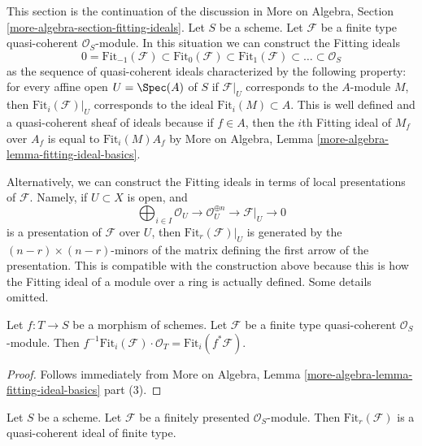 \noindent
This section is the continuation of the discussion in
More on Algebra, Section \ref{more-algebra-section-fitting-ideals}.
Let $S$ be a scheme. Let $\mathcal{F}$ be a
finite type quasi-coherent $\mathcal{O}_S$-module.
In this situation we can construct the Fitting ideals
$$
0 = \text{Fit}_{-1}(\mathcal{F}) \subset \text{Fit}_0(\mathcal{F}) \subset
\text{Fit}_1(\mathcal{F}) \subset \ldots \subset \mathcal{O}_S
$$
as the sequence of quasi-coherent ideals characterized by the following
property: for every affine open $U = \Spec(A)$ of $S$ if $\mathcal{F}|_U$
corresponds to the $A$-module $M$, then $\text{Fit}_i(\mathcal{F})|_U$
corresponds to the ideal $\text{Fit}_i(M) \subset A$.
This is well defined and a quasi-coherent sheaf of ideals because
if $f \in A$, then the $i$th Fitting ideal of $M_f$ over $A_f$
is equal to $\text{Fit}_i(M) A_f$ by
More on Algebra, Lemma \ref{more-algebra-lemma-fitting-ideal-basics}.

\medskip\noindent
Alternatively, we can construct the Fitting ideals in terms of local
presentations of $\mathcal{F}$. Namely, if $U \subset X$ is open, and
$$
\bigoplus\nolimits_{i \in I} \mathcal{O}_U \to
\mathcal{O}_U^{\oplus n} \to \mathcal{F}|_U \to 0
$$
is a presentation of $\mathcal{F}$ over $U$, then
$\text{Fit}_r(\mathcal{F})|_U$ is generated by the
$(n - r) \times (n - r)$-minors
of the matrix defining the first arrow of the presentation.
This is compatible with the construction above because this
is how the Fitting ideal of a module over a ring is actually defined.
Some details omitted.

\begin{lemma}
\label{lemma-base-change-fitting-ideal}
Let $f : T \to S$ be a morphism of schemes.
Let $\mathcal{F}$ be a finite type quasi-coherent $\mathcal{O}_S$-module.
Then
$f^{-1}\text{Fit}_i(\mathcal{F}) \cdot \mathcal{O}_T =
\text{Fit}_i(f^*\mathcal{F})$.
\end{lemma}

\begin{proof}
Follows immediately from More on Algebra, Lemma
\ref{more-algebra-lemma-fitting-ideal-basics} part (3).
\end{proof}

\begin{lemma}
\label{lemma-fitting-ideal-of-finitely-presented}
Let $S$ be a scheme.
Let $\mathcal{F}$ be a finitely presented $\mathcal{O}_S$-module.
Then $\text{Fit}_r(\mathcal{F})$ is a quasi-coherent ideal of finite type.
\end{lemma}


